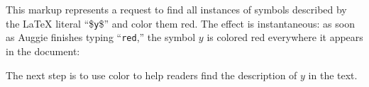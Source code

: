 This markup represents a request to find all instances of symbols described by the LaTeX literal ``\$\texttt{y}\$'' and color them red. The effect is instantaneous: as soon as Auggie finishes typing ``\texttt{red},'' the symbol $y$ is colored red everywhere it appears in the document: \\[1ex]

The next step is to use color to help readers find the description of $y$ in the text.

